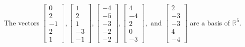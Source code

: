 \begin{exercise}
\begin{exerciseStatement}
  \end{exerciseStatement}
  \begin{exerciseAnswer}
   The vectors \(\left[\begin{array}{r}
0 \\
2 \\
-1 \\
2 \\
1
\end{array}\right] , \left[\begin{array}{r}
1 \\
2 \\
1 \\
-3 \\
-1
\end{array}\right] , \left[\begin{array}{r}
-4 \\
-5 \\
-3 \\
-2 \\
-2
\end{array}\right] , \left[\begin{array}{r}
4 \\
-4 \\
2 \\
0 \\
-3
\end{array}\right] , \text{ and } \left[\begin{array}{r}
2 \\
-3 \\
-3 \\
4 \\
-4
\end{array}\right]\) 
  	 are  a basis of \(\mathbb{R}^5\).
  


  \end{exerciseAnswer}
\end{exercise}